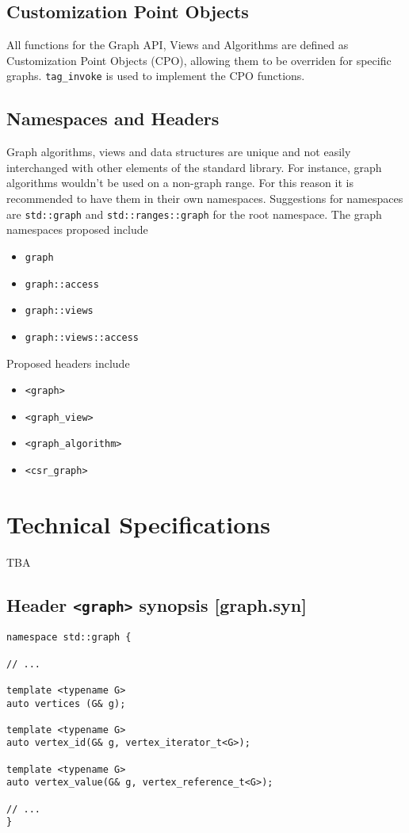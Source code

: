 \documentclass[10pt,onecolumn]{article}
\newcommand{\tcode}[1]{\lstinline[breaklines=true]{#1}}
\begin{document}
\subsection{Customization Point Objects}
All functions for the Graph API, Views and Algorithms are defined as Customization Point Objects (CPO), allowing them to be overriden for
specific graphs. \tcode{tag_invoke} is used to implement the CPO functions.

\subsection{Namespaces and Headers}
Graph algorithms, views and data structures are unique and not easily interchanged with other elements of the standard library. For
instance, graph algorithms wouldn't be used on a non-graph range. For this reason it is recommended to have them in their own 
namespaces. Suggestions for namespaces are \tcode{std::graph} and
\tcode{std::ranges::graph} for the root namespace. The graph namespaces proposed include
\begin{itemize}
\item[]\tcode{graph}
\item[]\tcode{graph::access}
\item[]\tcode{graph::views}
\item[]\tcode{graph::views::access}
\end{itemize}

Proposed headers include
\begin{itemize}
\item[]\tcode{<graph>}
\item[]\tcode{<graph_view>}
\item[]\tcode{<graph_algorithm>}
\item[]\tcode{<csr_graph>}
\end{itemize}

\section{Technical Specifications}
TBA

\subsection{Header \tcode{<graph>} synopsis [graph.syn]}

\begin{lstlisting}
namespace std::graph {

// ...

template <typename G>
auto vertices (G& g);

template <typename G>
auto vertex_id(G& g, vertex_iterator_t<G>);

template <typename G>
auto vertex_value(G& g, vertex_reference_t<G>);

// ...
}
\end{lstlisting}
\end{document}
